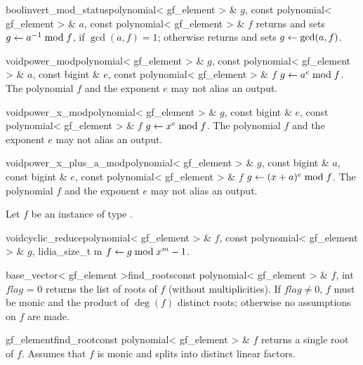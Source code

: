 \begin{fcode}{bool}{invert_mod_status}{polynomial< gf_element > & $g$,
    const polynomial< gf_element > & $a$, const polynomial< gf_element > & $f$}%
  returns \TRUE and sets $g \leftarrow a^{-1} \bmod f$, if $\gcd(a, f) = 1$; otherwise returns
  \FALSE and sets $g \leftarrow \gcd(a, f)$.
\end{fcode}

\begin{fcode}{void}{power_mod}{polynomial< gf_element > & $g$,
    const polynomial< gf_element > & $a$, const bigint & $e$,
    const polynomial< gf_element > & $f$}%
  $g \leftarrow a^e \bmod f$.  The polynomial $f$ and the exponent $e$ may not alias an output.
\end{fcode}

\begin{fcode}{void}{power_x_mod}{polynomial< gf_element > & $g$, const bigint & $e$,
    const polynomial< gf_element > & $f$}%
  $g \leftarrow x^e \bmod f$.  The polynomial $f$ and the exponent $e$ may not alias an output.
\end{fcode}

\begin{fcode}{void}{power_x_plus_a_mod}{polynomial< gf_element > & $g$, const bigint & $a$,
    const bigint & $e$, const polynomial< gf_element > & $f$}%
  $g \leftarrow (x + a)^e \bmod f$.  The polynomial $f$ and the exponent $e$ may not alias an
  output.
\end{fcode}



\HIGH

Let $f$ be an instance of type .

\begin{fcode}{void}{cyclic_reduce}{polynomial< gf_element > & $f$,
    const polynomial< gf_element > & $g$, lidia_size_t m}%
  $f \leftarrow g \bmod x^m-1$.
\end{fcode}

\begin{fcode}{base_vector< gf_element >}{find_roots}{const polynomial< gf_element > & $f$,
    int $\mathit{flag}$ = 0}%
  returns the list of roots of $f$ (without multiplicities).  If $\mathit{flag} \neq 0$, $f$
  must be monic and the product of $\deg(f)$ distinct roots; otherwise no assumptions on $f$ are
  made.
\end{fcode}

\begin{fcode}{gf_element}{find_root}{const polynomial< gf_element > & $f$}
  returns a single root of $f$.  Assumes that $f$ is monic and splits into distinct linear
  factors.
\end{fcode}

